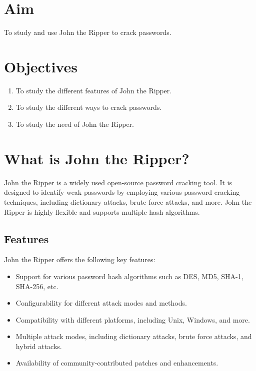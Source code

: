 \documentclass[11pt]{article}
\begin{document}
\tableofcontents
\thispagestyle{empty}
\clearpage

\setcounter{page}{1}

\section{Aim}
To study and use John the Ripper to crack passwords.
\section{Objectives}
\begin{enumerate}
    \item To study the different features of John the Ripper.
    \item To study the different ways to crack passwords.
    \item To study the need of John the Ripper.
\end{enumerate}

\section{What is John the Ripper?}
John the Ripper is a widely used open-source password cracking tool. It is designed to identify weak passwords by employing various password cracking techniques, including dictionary attacks, brute force attacks, and more. John the Ripper is highly flexible and supports multiple hash algorithms.

\subsection{Features}
John the Ripper offers the following key features:
\begin{itemize}
    \item Support for various password hash algorithms such as DES, MD5, SHA-1, SHA-256, etc.
    \item Configurability for different attack modes and methods.
    \item Compatibility with different platforms, including Unix, Windows, and more.
    \item Multiple attack modes, including dictionary attacks, brute force attacks, and hybrid attacks.
    \item Availability of community-contributed patches and enhancements.
\end{itemize}
\end{document}
